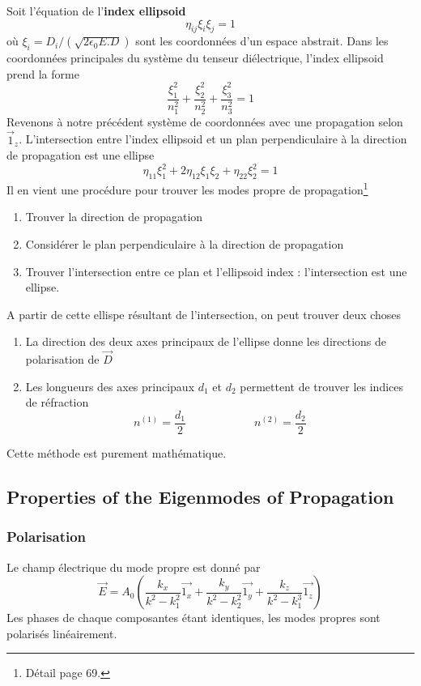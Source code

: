 Soit l'équation de l'\textbf{index ellipsoid}
\begin{equation}
\eta_{ij}\xi_i\xi_j=1
\end{equation}
où $\xi_i=D_i/(\sqrt{2\epsilon_0E.D})$ sont les coordonnées d'un espace abstrait. Dans les coordonnées
principales du système du tenseur diélectrique, l'index ellipsoid prend la forme
\begin{equation}
\dfrac{\xi^2_1}{n^2_1}+
\dfrac{\xi^2_2}{n^2_2}+
\dfrac{\xi^2_3}{n^2_3}=1
\end{equation}
Revenons à notre précédent système de coordonnées avec une propagation selon $\vec 1_z$. L'intersection
entre l'index ellipsoid et un plan perpendiculaire à la direction de propagation est une ellipse
\begin{equation}
\eta_{11}\xi^2_1 + 2\eta_{12}\xi_1\xi_2+\eta_{22}\xi_2^2=1
\end{equation}
Il en vient une procédure pour trouver les modes propre de propagation\footnote{Détail page 69.}
\begin{enumerate}
\item Trouver la direction de propagation
\item Considérer le plan perpendiculaire à la direction de propagation
\item Trouver l'intersection entre ce plan et l'ellipsoid index : l'intersection est une ellipse.
\end{enumerate}

A partir de cette ellispe résultant de l'intersection, on peut trouver deux choses
\begin{enumerate}
\item La direction des deux axes principaux de l'ellipse donne les directions de polarisation de $\vec{D}$
\item Les longueurs des axes principaux $d_1$ et $d_2$ permettent de trouver les indices de réfraction
\begin{equation}
n^{(1)} = \dfrac{d_1}{2}\qquad\qquad\qquad
n^{(2)} = \dfrac{d_2}{2}
\end{equation}
\end{enumerate}

Cette méthode est purement mathématique.






\subsection{Properties of the Eigenmodes of Propagation}
\subsubsection{Polarisation}
Le champ électrique du mode propre est donné par
\begin{equation}
\vec E = A_0\left(\dfrac{k_x}{k^ 2-k^2_1}\vec{1_x}+\dfrac{k_y}{k^ 2-k^2_2}\vec{1_y}+\dfrac{k_z}{k^ 2-k^3_1}\vec{1_z}
\right)
\end{equation}
Les phases de chaque composantes étant identiques, les modes propres sont polarisés linéairement.


